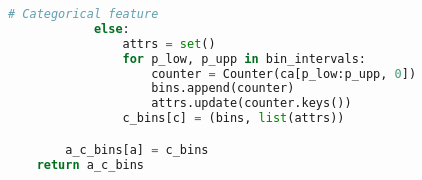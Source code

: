 \begin{lstlisting}[language=Python, label={lst:enrichments}, caption="Python code for computing enrichments near archetypes"]
            # Categorical feature
            else:
                attrs = set()
                for p_low, p_upp in bin_intervals:
                    counter = Counter(ca[p_low:p_upp, 0])
                    bins.append(counter)
                    attrs.update(counter.keys())
                c_bins[c] = (bins, list(attrs))

        a_c_bins[a] = c_bins
    return a_c_bins
\end{lstlisting}